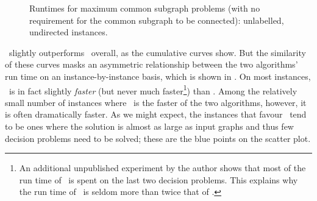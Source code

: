 \begin{figure}[htb!]
    \centering
    \par\bigskip
    \caption{Runtimes for maximum
    common subgraph problems (with no requirement for the common subgraph
    to be connected): unlabelled, undirected instances.}\label{figure:mcs-cumulative-plain-not-connected}
\end{figure}

\McSplitDown\ slightly outperforms \McSplit\ overall, as the cumulative curves
show. But the similarity of these curves masks an asymmetric relationship
between the two algorithms' run time on an instance-by-instance basis, which is
shown in .  On most instances, \McSplit\ is in fact
slightly \emph{faster} (but never much faster\footnote{An additional unpublished
experiment by the author shows
that most of the run time of \McSplitDown\ is spent on the last two decision
problems. This explains why the run time of \McSplitDown\ is seldom more than
twice that of \McSplit.}) than \McSplitDown.  Among the relatively
small number of instances where \McSplitDown\ is the faster of the two
algorithms, however, it is often dramatically faster.  As we might expect, the
instances that favour \McSplitDown\ tend to be ones where the solution is
almost as large as input graphs and thus few decision problems need to be
solved; these are the blue points on the scatter plot.

